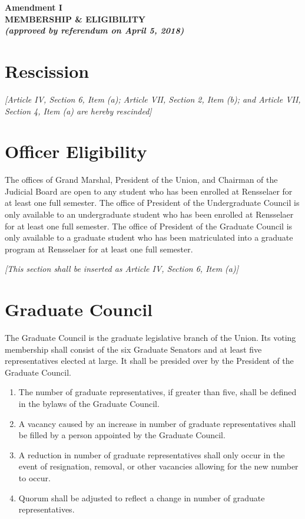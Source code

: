 \setcounter{section}{0}

\vspace{20pt}

\begin{center}
    \textbf{Amendment I \\ MEMBERSHIP \& ELIGIBILITY \\ \textit{\footnotesize (approved by referendum on April 5, 2018)}}
\end{center}

\section{Rescission}

\textit{[Article IV, Section 6, Item (a); Article VII, Section 2, Item (b); and Article VII, Section 4, Item (a) are hereby rescinded]}

\section{Officer Eligibility}

The offices of Grand Marshal, President of the Union, and Chairman of the Judicial Board are open to any student who has been enrolled at Rensselaer for at least one full semester. The office of President of the Undergraduate Council is only available to an undergraduate student who has been enrolled at Rensselaer for at least one full semester. The office of President of the Graduate Council is only available to a graduate student who has been matriculated into a graduate program at Rensselaer for at least one full semester.

\vspace{12pt}

\textit{[This section shall be inserted as Article IV, Section 6, Item (a)]}

\section{Graduate Council}

The Graduate Council is the graduate legislative branch of the Union. Its voting membership shall consist of the six Graduate Senators and at least five representatives elected at large. It shall be presided over by the President of the Graduate Council.

\begin{enumerate}
    \item The number of graduate representatives, if greater than five, shall be defined in the bylaws of the Graduate Council.
    \item A vacancy caused by an increase in number of graduate representatives shall be filled by a person appointed by the Graduate Council.
    \item A reduction in number of graduate representatives shall only occur in the event of resignation, removal, or other vacancies allowing for the new number to occur.
    \item Quorum shall be adjusted to reflect a change in number of graduate representatives.
\end{enumerate}

